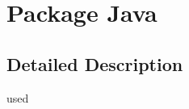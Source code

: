 \hypertarget{namespaceJava}{\section{Package Java}
\label{namespaceJava}
}


\subsection{Detailed Description}
used 